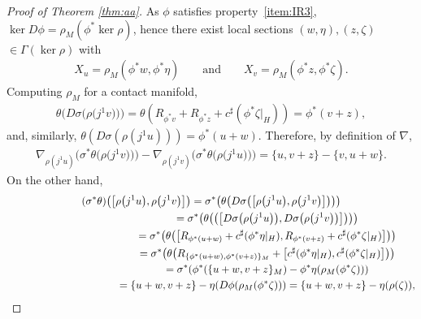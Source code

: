\documentclass[pdftex]{sigma}
\numberwithin{equation}{section}
\begin{document}
\begin{proof}[Proof of Theorem \ref{thm:aa}]
As $\phi$ satisf\/ies property~\ref{item:IR3}, $\ker D\phi =\rho_M (\phi^* \ker \rho)$, hence there exist local sections $(w,\eta), (z,\zeta)$ $\in \Gamma(\ker \rho)$ with
\begin{gather*}
 X_u = \rho_M(\phi^*w,\phi^*\eta) \qquad \text{and} \qquad X_v = \rho_M(\phi^*z,\phi^*\zeta).
\end{gather*}
Computing $\rho_M$ for a contact manifold,
\begin{gather*}
 \theta\big(D\sigma\big(\rho\big(j^1v\big)\big)\big) =\theta(R_{\phi^*v}+R_{\phi^*z}+c^\sharp(\phi^*\zeta|_H)) = \phi^*(v + z),
\end{gather*}
and, similarly, $\theta(D\sigma(\rho(j^1u))) = \phi^*(u+w)$. Therefore, by def\/inition of ${\nabla}$,
\begin{gather} \label{eq:31}
 {\nabla}_{\rho(j^1u)}\big(\sigma^*\theta\big(\rho\big(j^1v\big)\big)\big) - {\nabla}_{\rho(j^1v)}\big(\sigma^*\theta\big(\rho\big(j^1u\big)\big)\big) = \{u,v+z\} - \{v, u + w\}.
\end{gather}
On the other hand,
\begin{gather}
(\sigma^*\theta)\big(\big[\rho\big(j^1u\big), \rho\big(j^1v\big)\big]\big) =
 \sigma^*\big(\theta\big(D\sigma \big(\big[\rho\big(j^1u\big), \rho\big(j^1v\big)\big]\big) \big)\big) \nonumber\\
\hphantom{(\sigma^*\theta)\big(\big[\rho\big(j^1u\big), \rho\big(j^1v\big)\big]\big)}{}
 = \sigma^*\big(\theta\big(\big(\big[D\sigma \big(\rho\big(j^1u\big)\big), D\sigma\big(\rho\big(j^1v\big)\big)\big]\big)\big)\big) \nonumber\\
\hphantom{(\sigma^*\theta)\big(\big[\rho\big(j^1u\big), \rho\big(j^1v\big)\big]\big)}{}
 = \sigma^*\big(\theta\big(\big[R_{\phi^*(u+w)} +
 c^{\sharp}(\phi^*\eta|_H), R_{\phi^*(v+z)} + c^{\sharp}(\phi^*\zeta|_H)\big]\big)\big) \nonumber\\
\hphantom{(\sigma^*\theta)\big(\big[\rho\big(j^1u\big), \rho\big(j^1v\big)\big]\big)}{}
 = \sigma^*\big(\theta\big(R_{\{\phi^*(u+w), \phi^*(v+z)\}_M} + \big[c^{\sharp}(\phi^*\eta|_H), c^{\sharp}(\phi^*\zeta|_H)\big]\big)\big) \nonumber\\
\hphantom{(\sigma^*\theta)\big(\big[\rho\big(j^1u\big), \rho\big(j^1v\big)\big]\big)}{}
 = \sigma^*(\phi^*(\{u+w,v+z\}_M) - \phi^*\eta(\rho_M( \phi^*\zeta)))\label{eq:32}\\
\hphantom{(\sigma^*\theta)\big(\big[\rho\big(j^1u\big), \rho\big(j^1v\big)\big]\big)}{}
 = \{u+w,v+z\} - \eta(D\phi (\rho_M(
 \phi^*\zeta))) = \{u+w,v+z\} - \eta(\rho(\zeta)), \nonumber
\end{gather}

\end{proof}
\end{document}

